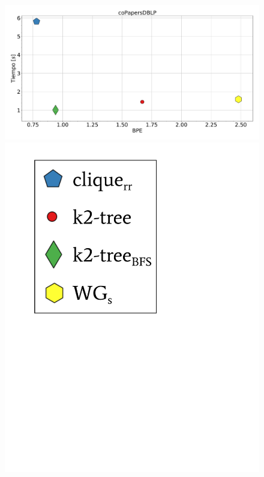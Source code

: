 \begin{figure}
    	\centering
    	\begin{minipage}{1\textwidth}
    			\centering
    			\begin{minipage}{0.8\textwidth}
    				\centering
    				\includegraphics[width=1\linewidth]{img/bpeTimes/secuencial/coPapersDBLP.pdf}
    			\end{minipage}
    			\begin{minipage}{0.15\textwidth}
    				\centering
    				\includegraphics[scale=.24, clip, trim=70 320 230 30]{img/bpeTimes/labelSec.pdf}
    			\end{minipage}
    			

\end{minipage}
\end{figure}
